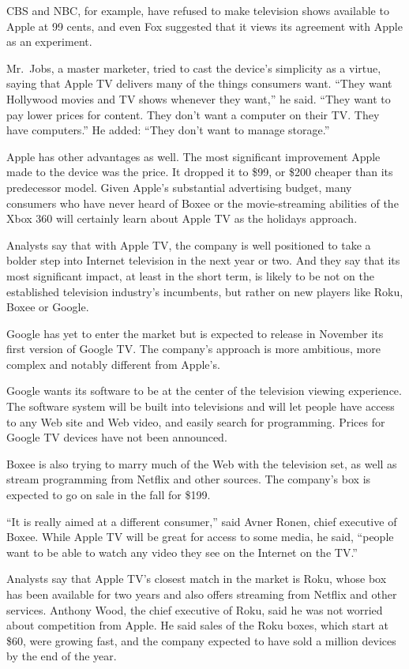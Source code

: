 ﻿\documentclass[12pt]{article}
\begin{document}
CBS and NBC, for example, have refused to make television shows available to Apple at 99 cents, and
even Fox suggested that it views its agreement with Apple as an experiment.

Mr.~Jobs, a master marketer, tried to cast the device's simplicity as a virtue, saying that Apple TV
delivers many of the things consumers want. ``They want Hollywood movies and TV shows whenever they
want,'' he said. ``They want to pay lower prices for content. They don't want a computer on their
TV. They have computers.'' He added: ``They don't want to manage storage.''

Apple has other advantages as well. The most significant improvement Apple made to the device was
the price. It dropped it to \$99, or \$200 cheaper than its predecessor model. Given Apple's
substantial advertising budget, many consumers who have never heard of Boxee or the movie-streaming
abilities of the Xbox 360 will certainly learn about Apple TV as the holidays approach.

Analysts say that with Apple TV, the company is well positioned to take a bolder step into Internet
television in the next year or two. And they say that its most significant impact, at least in the
short term, is likely to be not on the established television industry's incumbents, but rather on
new players like Roku, Boxee or Google.

Google has yet to enter the market but is expected to release in November its first version of
Google TV. The company's approach is more ambitious, more complex and notably different from
Apple's.

Google wants its software to be at the center of the television viewing experience. The software
system will be built into televisions and will let people have access to any Web site and Web video,
and easily search for programming. Prices for Google TV devices have not been announced.

Boxee is also trying to marry much of the Web with the television set, as well as stream programming
from Netflix and other sources. The company's box is expected to go on sale in the fall for \$199.

``It is really aimed at a different consumer,'' said Avner Ronen, chief executive of Boxee. While
Apple TV will be great for access to some media, he said, ``people want to be able to watch any
video they see on the Internet on the TV.''

Analysts say that Apple TV's closest match in the market is Roku, whose box has been available for
two years and also offers streaming from Netflix and other services. Anthony Wood, the chief
executive of Roku, said he was not worried about competition from Apple. He said sales of the Roku
boxes, which start at \$60, were growing fast, and the company expected to have sold a million
devices by the end of the year.
\end{document}
